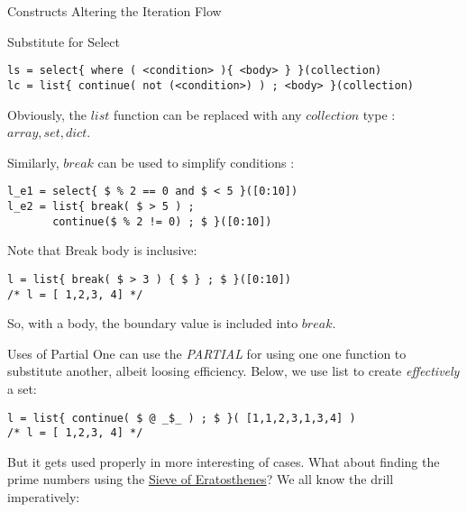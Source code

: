 \begin{section}{Constructs Altering the Iteration Flow}
\begin{subsection}{Substitute for Select}
\begin{lstlisting}[style=JexlStyle]
ls = select{ where ( <condition> ){ <body> } }(collection)
lc = list{ continue( not (<condition>) ) ; <body> }(collection)
\end{lstlisting}
Obviously, the $list$ function can be replaced with any $collection$ type : $array, set, dict$.

Similarly, $break$ can be used to simplify conditions :

\begin{lstlisting}[style=JexlStyle]
l_e1 = select{ $ % 2 == 0 and $ < 5 }([0:10])
l_e2 = list{ break( $ > 5 ) ; 
       continue($ % 2 != 0) ; $ }([0:10])
\end{lstlisting}

Note that Break body is inclusive:
  
\begin{lstlisting}[style=JexlStyle]
l = list{ break( $ > 3 ) { $ } ; $ }([0:10])
/* l = [ 1,2,3, 4] */
\end{lstlisting}
 
So, with a body, the boundary value is included into $break$.
\end{subsection}

\begin{subsection}{Uses of Partial}
One can use the \emph{PARTIAL} for using one one function to substitute another,
albeit loosing efficiency.
Below, we use list to create \emph{effectively} a set:

\begin{lstlisting}[style=JexlStyle]
l = list{ continue( $ @ _$_ ) ; $ }( [1,1,2,3,1,3,4] )
/* l = [ 1,2,3, 4] */
\end{lstlisting}

But it gets used properly in more interesting of cases.
What about finding the prime numbers using the \href{https://en.wikipedia.org/wiki/Sieve_of_Eratosthenes}{Sieve of Eratosthenes}?
We all know the drill imperatively:


\end{subsection}
\end{section}
